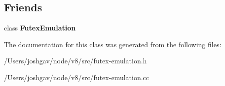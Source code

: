 \subsection*{Friends}
\begin{DoxyCompactItemize}
\item 
class {\bfseries Futex\+Emulation}\hypertarget{classv8_1_1internal_1_1_futex_wait_list_aac567adb4503b9486e8d84b85a01c1d8}{}\label{classv8_1_1internal_1_1_futex_wait_list_aac567adb4503b9486e8d84b85a01c1d8}

\end{DoxyCompactItemize}


The documentation for this class was generated from the following files\+:\begin{DoxyCompactItemize}
\item 
/\+Users/joshgav/node/v8/src/futex-\/emulation.\+h\item 
/\+Users/joshgav/node/v8/src/futex-\/emulation.\+cc\end{DoxyCompactItemize}
